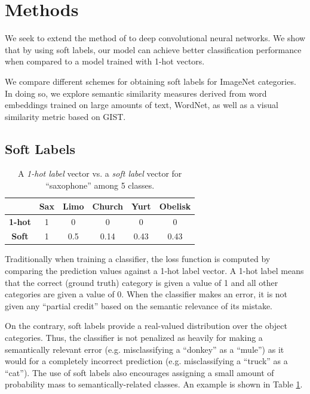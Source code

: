 \section{Methods}

We seek to extend the method of \cite{zhao2011large} to deep convolutional
neural networks.  We show that by using soft labels, our model can achieve
better classification performance when compared to a model trained with 1-hot
vectors.



We compare different schemes for obtaining soft labels for ImageNet categories.
In doing so, we explore semantic similarity measures derived from word
embeddings trained on large amounts of text, WordNet, as well as a visual
similarity metric based on GIST.


\subsection{Soft Labels}
\label{sec:soft_labels}

\begin{table}[!tb]
  \centering
  \begin{tabular}{|c|c|c|c|c|c|}
    \hline
      & Sax & Limo & Church & Yurt & Obelisk \\
    \hline
      \textbf{1-hot} & 1 & 0 & 0 & 0  & 0 \\
    \hline
      \textbf{Soft} & 1 & 0.5 & 0.14 & 0.43 & 0.43 \\
    \hline
  \end{tabular}
  \caption{
    A \emph{1-hot label} vector vs. a \emph{soft label} vector for
    ``saxophone'' among 5 classes.
  }
  \label{tbl:soft_labels}
\end{table}

Traditionally when training a classifier, the loss function is computed by
comparing the prediction values against a 1-hot label vector. A 1-hot label
means that the correct (ground truth) category is given a value of 1 and all
other categories are given a value of 0. When the classifier makes an error, it
is not given any ``partial credit'' based on the semantic relevance of its
mistake.

On the contrary, soft labels provide a real-valued distribution over the object
categories. Thus, the classifier is not penalized as heavily for making a
semantically relevant error (e.g. misclassifying a ``donkey'' as a ``mule'') as
it would for a completely incorrect prediction (e.g. misclassifying a ``truck''
as a ``cat''). The use of soft labels also encourages assigning a small amount
of probability mass to semantically-related classes. An example is shown in
Table \ref{tbl:soft_labels}.

